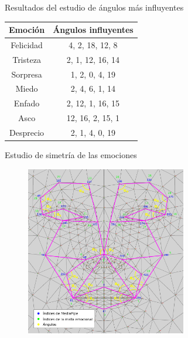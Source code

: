 \documentclass{beamer}
\begin{document}
\begin{frame}{Resultados del estudio de ángulos más influyentes}
\begin{table}[H]
\begin{center}
\begin{tabular}{|c|c|}
     \hline
    \textbf{Emoción} & \textbf{Ángulos influyentes} \\
    \hline
     Felicidad & 4, 2, 18, 12, 8 \\
     Tristeza & 2, 1, 12, 16, 14 \\
     Sorpresa & 1, 2, 0, 4, 19 \\
     Miedo & 2, 4, 6, 1, 14 \\
     Enfado & 2, 12, 1, 16, 15 \\
     Asco & 12, 16, 2, 15, 1 \\
     Desprecio & 2, 1, 4, 0, 19 \\
     \hline
 \end{tabular}
\end{center}
\end{table}
\end{frame}

\begin{frame}{Estudio de simetría de las emociones}
\begin{figure}[h!]
  \begin{center}
    \includegraphics[width=7cm]{figs/emotional_mesh_2_mitades.png}
  \end{center}
\end{figure}
\end{frame}
\end{document}
